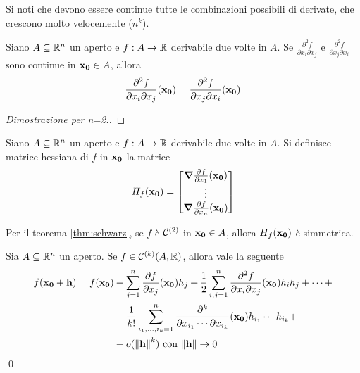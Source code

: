 \begin{remark}
    Si noti che devono essere continue tutte le combinazioni possibili di derivate, che crescono molto velocemente ($n^k$).
\end{remark}

\begin{theorem}
    [di Schwarz]\label{thm:schwarz}
    Siano $A \subseteq \mathbb{R}^n$ un aperto e $f: A \to \mathbb{R}$ derivabile due volte in $A$. Se $\frac{\partial ^2 f}{\partial x_i \partial x_j}$ e $\frac{\partial^2 f}{\partial x_j \partial x_i}$ sono continue in $\vb{x_0} \in A$, allora
    $$
        \frac{\partial ^2 f}{\partial x_i \partial x_j}(\vb{x_0}) = \frac{\partial^2  f}{\partial x_j \partial x_i}(\vb{x_0})
    $$
\end{theorem}

\begin{proof}
    [Dimostrazione per n=2.] %
\end{proof}

\begin{definition}
    Siano $A \subseteq \mathbb{R}^n$ un aperto e $f: A \to \mathbb{R}$ derivabile due volte in $A$. Si definisce matrice hessiana di $f$ in $\vb{x_0}$ la matrice
    $$
        H_f(\vb{x_0}) =
        \begin{bmatrix}
            \grad \frac{\partial f}{\partial x_1}(\vb{x_0})\\
            \vdots\\
            \grad \frac{\partial f}{\partial x_n}(\vb{x_0})
        \end{bmatrix}
    $$
\end{definition}

\begin{remark}
    Per il teorema \ref{thm:schwarz}, se $f$ è $\mathcal{C}^{(2)}$ in $\vb{x_0} \in A$, allora $H_f(\vb{x_0})$ è simmetrica.
\end{remark}

\begin{theorem}
    Sia $A \subseteq \mathbb{R}^n$ un aperto. Se $f \in \mathcal{C}^{(k)}(A, \mathbb{R})$, allora vale la seguente
    \begin{align*}
        f(\vb{x_0}+ \vb{h})= f(\vb{x_0})&+\sum_{j=1}^{n}\frac{\partial f}{\partial x_j}(\vb{x_0})h_j + \frac{1}{2}\sum_{i,j=1}^{n}\frac{\partial^2 f}{\partial x_i \partial x_j}(\vb{x_0})h_ih_j+\cdots+\\
        &+\frac{1}{k!}\sum_{i_1,\dots,i_k=1}^n\frac{\partial^k}{\partial x_{i_1}\cdots\partial x_{i_k}}(\vb{x_0})h_{i_1}\cdots h_{i_k} +\\
        &+o (\norm{\vb{h}}^k) \text{ con } \norm{\vb{h}} \to 0
    \end{align*}
    \qed
\end{theorem}

